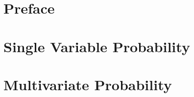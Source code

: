 \chapter*{Preface}


\clearpage
\chapter{Single Variable Probability}


\clearpage
\chapter{Multivariate Probability}

